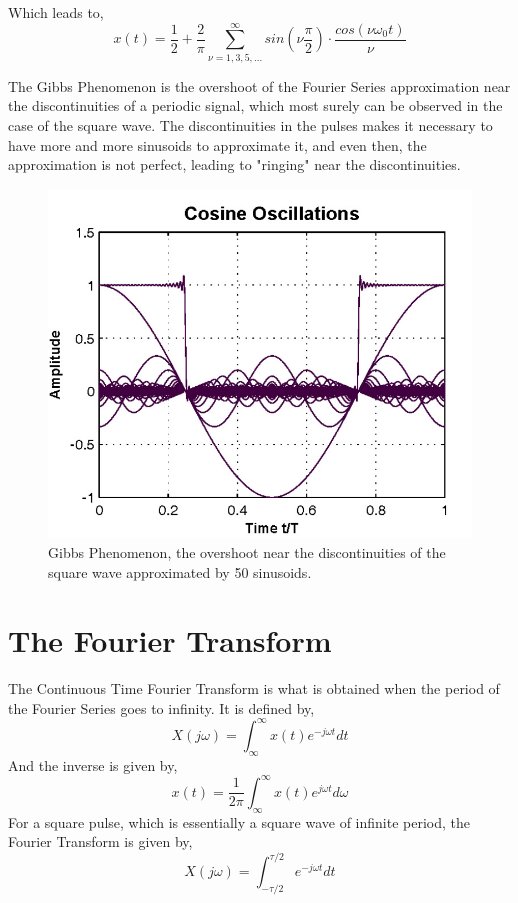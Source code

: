 Which leads to,
\begin{equation}
    x(t) = \frac{1}{2} + \frac{2}{\pi}\sum_{\nu=1,3,5,...}^{\infty}sin(\nu\frac{\pi}{2})\cdot\frac{cos(\nu\omega_0t)}{\nu}
\end{equation}

The Gibbs Phenomenon is the overshoot of the Fourier Series approximation near the discontinuities of a periodic signal, which most surely can be observed in the case of the square wave. The discontinuities in the pulses makes it necessary to have more and more sinusoids to approximate it, and even then, the approximation is not perfect, leading to "ringing" near the discontinuities.

\begin{figure}[H]
    \centering
    \includegraphics[width=0.8\linewidth]{images/gibbs_phenomenon.png}
    \caption{\centering Gibbs Phenomenon, the overshoot near the discontinuities of the square wave approximated by 50 sinusoids.}
    \label{fig:gibbs_phenomenon}
\end{figure}

\section{The Fourier Transform}

The Continuous Time Fourier Transform is what is obtained when the period of the Fourier Series goes to infinity.
It is defined by,
\begin{equation}
    X(j\omega) = \int_{\infty}^{\infty}x(t)e^{-j\omega t}dt
\end{equation}
And the inverse is given by,
\begin{equation}
    x(t) = \frac{1}{2\pi}\int_{\infty}^{\infty}x(t)e^{j \omega t}d\omega
\end{equation}
For a square pulse, which is essentially a square wave of infinite period, the Fourier Transform is given by,
\begin{equation}
    X(j\omega) = \int_{-\tau/2}^{\tau/2}e^{-j\omega t} dt
\end{equation}


